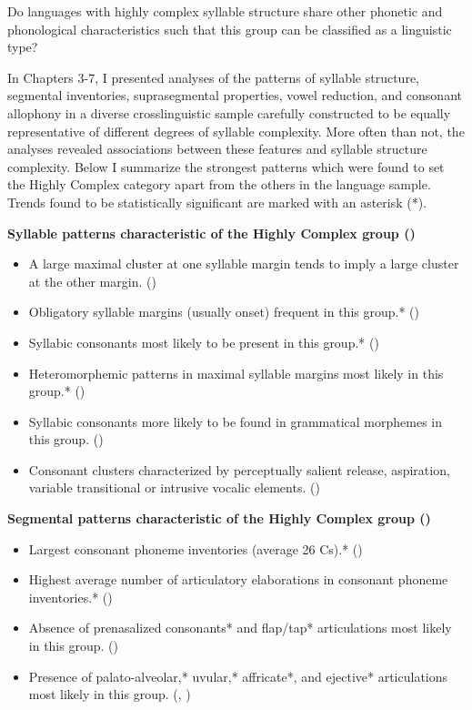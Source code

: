 \ea\label{ex:8.1}
   {Do languages with highly complex syllable structure share other phonetic and phonological characteristics such that this group can be classified as a linguistic type?}
\z

  In Chapters 3-7, I presented analyses of the patterns of syllable structure, segmental inventories, suprasegmental properties, vowel reduction, and consonant allophony in a diverse crosslinguistic sample carefully constructed to be equally representative of different degrees of syllable complexity. More often than not, the analyses revealed associations between these features and syllable structure complexity. Below I summarize the strongest patterns which were found to set the Highly Complex category apart from the others in the language sample. Trends found to be statistically significant are marked with an asterisk (*).

\textbf{Syllable patterns characteristic of the Highly Complex group ()}

\begin{itemize}
\item A large maximal cluster at one syllable margin tends to imply a large cluster at the other margin. {()}
\item Obligatory syllable margins (usually onset) frequent in this group.* {()}
\item Syllabic consonants most likely to be present in this group.* {()}
\item Heteromorphemic patterns in maximal syllable margins most likely in this group.* {()}
\item Syllabic consonants more likely to be found in grammatical morphemes in this group. {()}
\item Consonant clusters characterized by perceptually salient release, aspiration, variable transitional or intrusive vocalic elements. (\textit{})
\end{itemize}

\textbf{Segmental patterns characteristic of the Highly Complex group ()}

\begin{itemize}
\item Largest consonant phoneme inventories (average 26 Cs).* {()}
\item Highest average number of articulatory elaborations in consonant phoneme inventories.* ()
\item Absence of prenasalized consonants* and flap/tap* articulations most likely in this group. {()}
\item Presence of palato-alveolar,* uvular,* affricate*, and ejective* articulations most likely in this group. {(, )}
\end{itemize}


